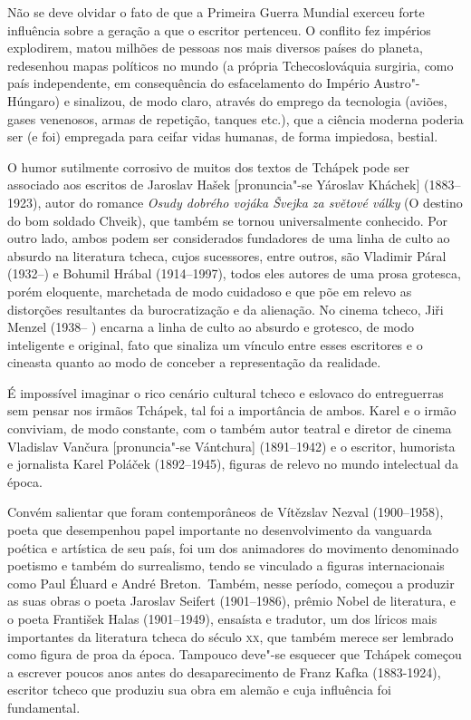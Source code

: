 Não se deve olvidar o fato de que a Primeira Guerra Mundial exerceu forte
influência sobre a geração a que o escritor pertenceu. O conflito fez impérios
explodirem, matou milhões de pessoas nos mais diversos países do planeta,
redesenhou mapas políticos no mundo (a própria Tchecoslováquia surgiria, como
país independente, em consequência do esfacelamento do Império Austro"-Húngaro)
e sinalizou, de modo claro, através do emprego da tecnologia (aviões, gases
venenosos, armas de repetição, tanques etc.), que a ciência
moderna poderia ser (e foi) empregada para ceifar vidas humanas, de forma
impiedosa, bestial. 

O humor sutilmente corrosivo de muitos dos textos de Tchápek pode ser
associado aos escritos de Jaroslav Hašek [pronuncia"-se  Yároslav Kháchek]
(1883--1923), autor do romance \textit{Osudy dobrého
vojáka Švejka za světové války} (O destino do bom soldado Chveik), 
que também se tornou universalmente conhecido.
Por outro lado, ambos podem ser considerados fundadores de uma linha de culto
ao absurdo na literatura tcheca, cujos sucessores, entre outros, são Vladimir
Páral (1932--) e Bohumil Hrábal (1914--1997), todos eles autores de uma prosa
grotesca, porém eloquente, marchetada de modo cuidadoso e que põe em relevo as
distorções resultantes da burocratização e da alienação. No cinema tcheco, Jiři
Menzel (1938-- ) encarna a linha de culto ao absurdo e grotesco, de modo
inteligente e original, fato que sinaliza um vínculo entre esses escritores e o
cineasta quanto ao modo de conceber a representação da realidade. 

É impossível imaginar o rico cenário cultural tcheco e eslovaco do
entreguerras sem pensar nos irmãos Tchápek, tal foi a importância de ambos. Karel
e o irmão conviviam, de modo constante, com o também autor teatral e diretor de
cinema Vladislav Vančura [pronuncia"-se Vántchura] (1891--1942) e o escritor,
humorista e jornalista Karel Poláček (1892--1945), figuras de relevo no mundo
intelectual da época.

Convém salientar que foram contemporâneos de Vítězslav Nezval (1900--1958),
poeta que desempenhou papel importante no desenvolvimento da vanguarda poética		
e artística de seu país, foi um dos animadores do movimento denominado poetismo
 e também do surrealismo, tendo se vinculado a figuras internacionais como Paul
Éluard e André Breton.~Também, nesse período, começou a produzir as suas obras
o poeta Jaroslav Seifert (1901--1986), prêmio Nobel de literatura, e o poeta
František Halas (1901--1949), ensaísta e tradutor, um dos líricos mais
importantes da literatura tcheca do século \textsc{xx}, que também merece ser lembrado
como figura de proa da época. Tampouco deve"-se esquecer que Tchápek começou a
escrever poucos anos antes do desaparecimento de Franz Kafka (1883-1924),
escritor tcheco que produziu sua obra em alemão e cuja influência foi
fundamental.


